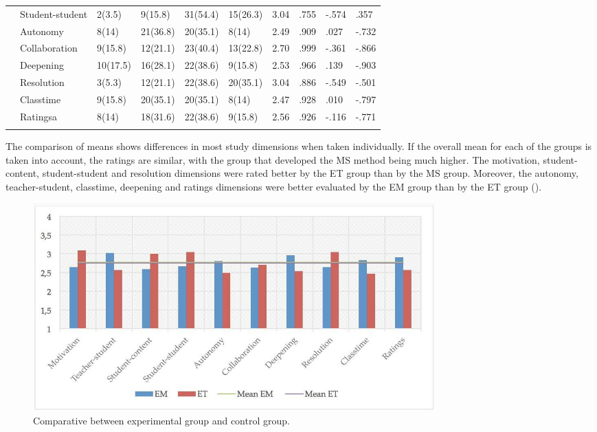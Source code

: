 \documentclass{textolivre}
\begin{document}
\begin{table}[htpb]
\begin{tabular}{p{}p{}p{}p{}p{}p{}p{}p{}p{}p{}}
\\
& Student-student & 2(3.5) & 9(15.8) & 31(54.4) & 15(26.3) & 3.04 & .755 & -.574 & .357
\\
& Autonomy	& 8(14) & 21(36.8) & 20(35.1) & 8(14) & 2.49 & .909 & .027 & -.732
\\
& Collaboration	& 9(15.8) & 12(21.1) & 23(40.4) & 13(22.8) & 2.70 & .999 & -.361 & -.866
\\
& Deepening	& 10(17.5) & 16(28.1) & 22(38.6) & 9(15.8) & 2.53 & .966 & .139 & -.903
\\
& Resolution & 3(5.3) & 12(21.1) & 22(38.6) & 20(35.1) & 3.04 & .886 & -.549 & -.501
\\
& Classtime	& 9(15.8) & 20(35.1) & 20(35.1) & 8(14) & 2.47 & .928 & .010 & -.797
\\
& Ratingsa & 8(14) & 18(31.6) & 22(38.6) & 9(15.8) & 2.56 & .926 & -.116 & -.771
\\
\arrayrulecolor{black}
\bottomrule
\end{tabular}
\centering
{}
\end{table}

The comparison of means shows differences in most study dimensions when taken individually. If the overall mean for each of the groups is taken into account, the ratings are similar, with the group that developed the MS method being much higher. The motivation, student-content, student-student and resolution dimensions were rated better by the ET group than by the MS group. Moreover, the autonomy, teacher-student, classtime, deepening and ratings dimensions were better evaluated by the EM group than by the ET group ().

\begin{figure}[htbp]
 \centering
 \includegraphics[width=0.75\textwidth]{fig-004.jpg}
 \caption{Comparative between experimental group and control group.}
 \label{fig4}
\end{figure}
\end{document}

